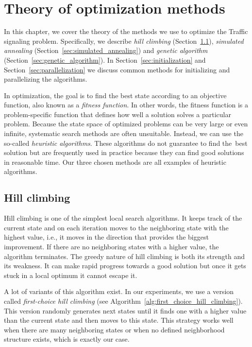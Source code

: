 \chapter{Theory of optimization methods} \label{chap:optimization_methods}

In this chapter, we cover the theory of the methods we use to optimize the Traffic signaling problem. Specifically, we describe \textit{hill climbing} (Section~\ref{sec:hill_climbing}), \textit{simulated annealing} (Section~\ref{sec:simulated_annealing}) and \textit{genetic algorithm} (Section~\ref{sec:genetic_algorithm}). In Section~\ref{sec:initialization} and Section~\ref{sec:parallelization} we discuss common methods for initializing and parallelizing the algorithms.

In optimization, the goal is to find the best state according to an objective function, also known as a \textit{fitness function}. In other words, the fitness function is a problem-specific function that defines how well a solution solves a particular problem.
Because the state space of optimized problems can be very large or even infinite, systematic search methods are often unsuitable. Instead, we can use the so-called \textit{heuristic algorithms}. These algorithms do not guarantee to find the~best solution but are frequently used in practice because they can find good solutions in reasonable time. Our three chosen methods are all examples of heuristic algorithms.

\section{Hill climbing} \label{sec:hill_climbing}

Hill climbing \cite{russell2020artificial, luke2013essentials} is one of the simplest local search algorithms. It keeps track of the current state and on each iteration moves to the neighboring state with the highest value, i.e., it moves in the direction that provides the biggest improvement. If there are no neighboring states with a higher value, the algorithm terminates. The greedy nature of hill climbing is both its strength and its weakness. It can make rapid progress towards a good solution but once it gets stuck in a local optimum it cannot escape it.

A lot of variants of this algorithm exist. In our experiments, we use a version called \textit{first-choice hill climbing} (see Algorithm~\ref{alg:first_choice_hill_climbing}). This version randomly generates next states until it finds one with a higher value than the current state and then moves to this state. This strategy works well when there are many neighboring states or when no defined neighborhood structure exists, which is exactly our case.

